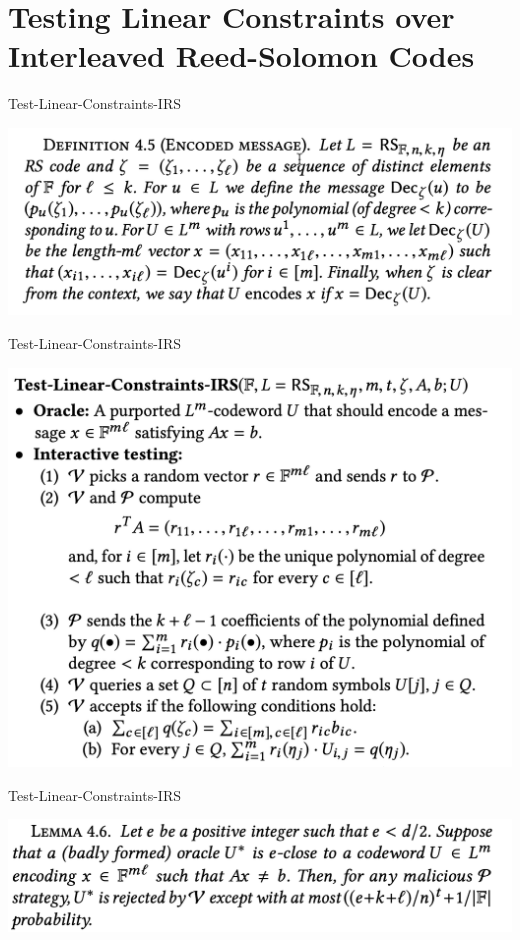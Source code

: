 \documentclass{beamer}
\begin{document}
\section{Testing Linear Constraints over Interleaved
	Reed-Solomon Codes}


\begin{frame}{Test-Linear-Constraints-IRS}
	\begin{minipage}{0.42\linewidth}
		\includegraphics[scale=0.42]{5.png}
	\end{minipage}
\end{frame}

\begin{frame}{Test-Linear-Constraints-IRS}
	\begin{minipage}{0.42\linewidth}
		\includegraphics[scale=0.30]{4.png}
	\end{minipage}

\end{frame}


\begin{frame}{Test-Linear-Constraints-IRS}
	\begin{minipage}{0.42\linewidth}
		\includegraphics[scale=0.52]{8.png}
	\end{minipage}
	
\end{frame}
\end{document}
